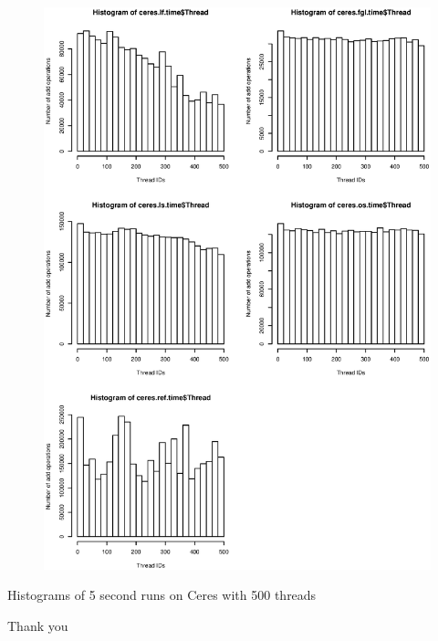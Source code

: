 \begin{figure}[H]
  \centering
  \includegraphics[height=0.90\textheight]{pictures/ceres_fairness_plot.eps}
  \label{ceresfairness}
\end{figure}
Histograms of 5 second runs on Ceres with 500 threads


\begin{frame}
\Huge{\centerline{Thank you}}
\end{frame}
